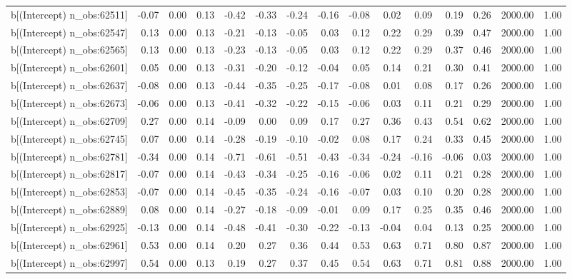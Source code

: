 \begin{table}[ht]
\begin{tabular}{rrrrrrrrrrrrrrr}
  b[(Intercept) n\_obs:62511] & -0.07 & 0.00 & 0.13 & -0.42 & -0.33 & -0.24 & -0.16 & -0.08 & 0.02 & 0.09 & 0.19 & 0.26 & 2000.00 & 1.00 \\ 
  b[(Intercept) n\_obs:62547] & 0.13 & 0.00 & 0.13 & -0.21 & -0.13 & -0.05 & 0.03 & 0.12 & 0.22 & 0.29 & 0.39 & 0.47 & 2000.00 & 1.00 \\ 
  b[(Intercept) n\_obs:62565] & 0.13 & 0.00 & 0.13 & -0.23 & -0.13 & -0.05 & 0.03 & 0.12 & 0.22 & 0.29 & 0.37 & 0.46 & 2000.00 & 1.00 \\ 
  b[(Intercept) n\_obs:62601] & 0.05 & 0.00 & 0.13 & -0.31 & -0.20 & -0.12 & -0.04 & 0.05 & 0.14 & 0.21 & 0.30 & 0.41 & 2000.00 & 1.00 \\ 
  b[(Intercept) n\_obs:62637] & -0.08 & 0.00 & 0.13 & -0.44 & -0.35 & -0.25 & -0.17 & -0.08 & 0.01 & 0.08 & 0.17 & 0.26 & 2000.00 & 1.00 \\ 
  b[(Intercept) n\_obs:62673] & -0.06 & 0.00 & 0.13 & -0.41 & -0.32 & -0.22 & -0.15 & -0.06 & 0.03 & 0.11 & 0.21 & 0.29 & 2000.00 & 1.00 \\ 
  b[(Intercept) n\_obs:62709] & 0.27 & 0.00 & 0.14 & -0.09 & 0.00 & 0.09 & 0.17 & 0.27 & 0.36 & 0.43 & 0.54 & 0.62 & 2000.00 & 1.00 \\ 
  b[(Intercept) n\_obs:62745] & 0.07 & 0.00 & 0.14 & -0.28 & -0.19 & -0.10 & -0.02 & 0.08 & 0.17 & 0.24 & 0.33 & 0.45 & 2000.00 & 1.00 \\ 
  b[(Intercept) n\_obs:62781] & -0.34 & 0.00 & 0.14 & -0.71 & -0.61 & -0.51 & -0.43 & -0.34 & -0.24 & -0.16 & -0.06 & 0.03 & 2000.00 & 1.00 \\ 
  b[(Intercept) n\_obs:62817] & -0.07 & 0.00 & 0.14 & -0.43 & -0.34 & -0.25 & -0.16 & -0.06 & 0.02 & 0.11 & 0.21 & 0.28 & 2000.00 & 1.00 \\ 
  b[(Intercept) n\_obs:62853] & -0.07 & 0.00 & 0.14 & -0.45 & -0.35 & -0.24 & -0.16 & -0.07 & 0.03 & 0.10 & 0.20 & 0.28 & 2000.00 & 1.00 \\ 
  b[(Intercept) n\_obs:62889] & 0.08 & 0.00 & 0.14 & -0.27 & -0.18 & -0.09 & -0.01 & 0.09 & 0.17 & 0.25 & 0.35 & 0.46 & 2000.00 & 1.00 \\ 
  b[(Intercept) n\_obs:62925] & -0.13 & 0.00 & 0.14 & -0.48 & -0.41 & -0.30 & -0.22 & -0.13 & -0.04 & 0.04 & 0.13 & 0.25 & 2000.00 & 1.00 \\ 
  b[(Intercept) n\_obs:62961] & 0.53 & 0.00 & 0.14 & 0.20 & 0.27 & 0.36 & 0.44 & 0.53 & 0.63 & 0.71 & 0.80 & 0.87 & 2000.00 & 1.00 \\ 
  b[(Intercept) n\_obs:62997] & 0.54 & 0.00 & 0.13 & 0.19 & 0.27 & 0.37 & 0.45 & 0.54 & 0.63 & 0.71 & 0.81 & 0.88 & 2000.00 & 1.00 \\ 

\end{tabular}
\end{table}
